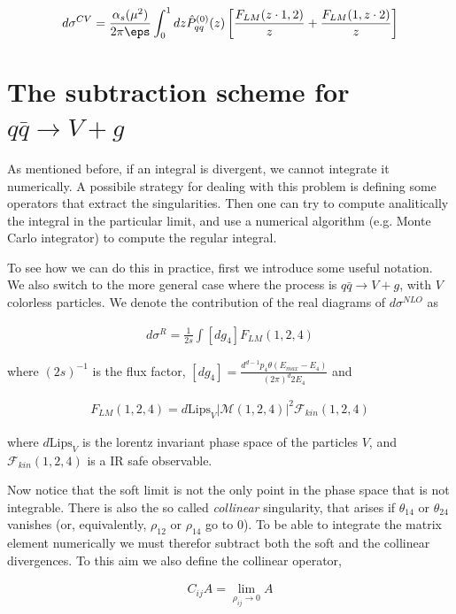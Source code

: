 \documentclass[11pt]{report}
\begin{document}
\begin{align}
    \label{eq:pdfpartoniccounterterm}
    d\sigma^{CV} = \frac{\alpha_s(\mu^2)}{2\pi\eps}\int_0^1 dz \hat{P}_{qq}^{(0)}(z)\left[ \frac{F_{LM}(z\cdot1, 2)}{z} + \frac{F_{LM}(1, z\cdot 2)}{z} \right]
\end{align}

\section{The subtraction scheme for \(q\bar{q} \to V + g\)}

As mentioned before, if an integral is divergent, we cannot integrate it numerically. A possibile strategy for dealing with this problem is defining some operators that extract the singularities. Then one can try to compute analitically the integral in the particular limit, and use a numerical algorithm (e.g. Monte Carlo integrator) to compute the regular integral.   

To see how we can do this in practice, first we introduce some useful notation. We also switch to the more general case where the process is \(q\bar{q} \to V + g\), with \(V\) colorless particles. We denote the contribution of the real diagrams of \(d\sigma^{NLO}\) as 

\begin{align}
    d\sigma^R = \frac{1}{2s}\int [dg_4] F_{LM}(1, 2, 4)
\end{align}

where \((2s)^{-1}\) is the flux factor, \([dg_4] = \frac{d^{d-1}p_4\theta(E_{max}-E_4)}{(2\pi)^d 2E_4}\) and 

\begin{align}
    F_{LM}(1, 2, 4) = d\text{Lips}_V |\mathcal{M}(1, 2,4)|^2 \mathcal{F}_{kin}(1, 2, 4)
\end{align}

where \(d\text{Lips}_V\) is the lorentz invariant phase space of the particles \(V\), and \(\mathcal{F}_{kin}(1, 2, 4)\) is a IR safe observable. 

Now notice that the soft limit is not the only point in the phase space that is not integrable. There is also the so called \emph{collinear} singularity, that arises if \(\theta_{14}\) or \(\theta_{24}\) vanishes (or, equivalently, \(\rho_{12}\) or \(\rho_{14}\) go to 0). To be able to integrate the matrix element numerically we must therefor subtract both the soft and the collinear divergences. To this aim we also define the collinear operator, 

\begin{align}
    C_{ij}A = \lim_{\rho_{ij} \to 0}A 
\end{align}
\end{document}

